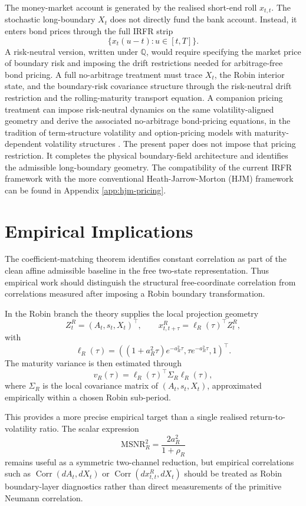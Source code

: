 \documentclass[11pt]{article}
\numberwithin{equation}{section}
\begin{document}
The money-market account is generated by the realised short-end roll \(x_{t,t}\). The stochastic long-boundary \(X_t\) does not directly fund the bank account. Instead, it enters bond prices through the full IRFR strip
\[
\{x_t(u-t):u\in[t,T]\}.
\]
A risk-neutral version, written under \(\mathbb Q\), would require specifying the market price of boundary risk and imposing the drift restrictions needed for arbitrage-free bond pricing. A full no-arbitrage treatment must trace \(X_t\), the Robin interior state, and the boundary-risk covariance structure through the risk-neutral drift restriction and the rolling-maturity transport equation. A companion pricing treatment can impose risk-neutral dynamics on the same volatility-aligned geometry and derive the associated no-arbitrage bond-pricing equations, in the tradition of term-structure volatility and option-pricing models with maturity-dependent volatility structures \cite{RitchkenChuang}. The present paper does not impose that pricing restriction. It completes the physical boundary-field architecture and identifies the admissible long-boundary geometry. The compatibility of the current IRFR framework with the more conventional Heath-Jarrow-Morton (HJM) framework can be found in Appendix \ref{app:hjm-pricing}.


\section{Empirical Implications}

The coefficient-matching theorem identifies constant correlation as part of the clean affine admissible baseline in the free two-state representation. Thus empirical work should distinguish the structural free-coordinate correlation from correlations measured after imposing a Robin boundary transformation.

In the Robin branch the theory supplies the local projection geometry
\[
Z^R_t=(A_t,s_t,X_t)^\top,
\qquad
x^R_{t,t+\tau}=\ell_R(\tau)^\top Z^R_t,
\]
with
\[
\ell_R(\tau)=
\left(
(1+a_R^2\tau)e^{-a_R^2\tau},
\tau e^{-a_R^2\tau},
1
\right)^\top.
\]
The maturity variance is then estimated through
\[
        v_R(\tau)=\ell_R(\tau)^\top\Sigma_R\ell_R(\tau),
\]
where \(\Sigma_R\) is the local covariance matrix of \((A_t,s_t,X_t)\), approximated empirically within a chosen Robin sub-period.

This provides a more precise empirical target than a single realised return-to-volatility ratio. The scalar expression
\[
        \mathrm{MSNR}_{R}^{2}=\frac{2a_R^2}{1+\rho_R}
\]
remains useful as a symmetric two-channel reduction, but empirical correlations such as \(\operatorname{Corr}(dA_t,dX_t)\) or \(\operatorname{Corr}(dx^R_{t,t},dX_t)\) should be treated as Robin boundary-layer diagnostics rather than direct measurements of the primitive Neumann correlation.
\end{document}

